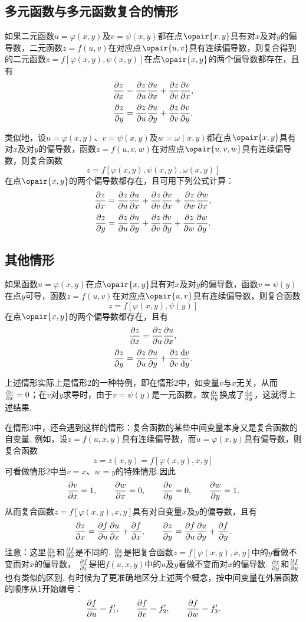 \subsection{多元函数与多元函数复合的情形}
\begin{theorem}
如果二元函数\(u=\varphi(x,y)\)及\(v=\psi(x,y)\)都在点\(\opair{x,y}\)具有对\(x\)及对\(y\)的偏导数，二元函数\(z=f(u,v)\)在对应点\(\opair{u,v}\)具有连续偏导数，则复合得到的二元函数\(z=f[\varphi(x,y),\psi(x,y)]\)在点\(\opair{x,y}\)的两个偏导数都存在，且有\[
\pdv{z}{x} = \pdv{z}{u}\pdv{u}{x} + \pdv{z}{v}\pdv{v}{x},
\]\[
\pdv{z}{y} = \pdv{z}{u}\pdv{u}{y} + \pdv{z}{v}\pdv{v}{y}.
\]
\end{theorem}
类似地，设\(u=\varphi(x,y)\)、\(v=\psi(x,y)\)及\(w=\omega(x,y)\)都在点\(\opair{x,y}\)具有对\(x\)及对\(y\)的偏导数，函数\(z=f(u,v,w)\)在对应点\(\opair{u,v,w}\)具有连续偏导数，则复合函数\[
z = f[\varphi(x,y),\psi(x,y),\omega(x,y)]
\]在点\(\opair{x,y}\)的两个偏导数都存在，且可用下列公式计算：\[
\pdv{z}{x} = \pdv{z}{u}\pdv{u}{x} + \pdv{z}{v}\pdv{v}{x} + \pdv{z}{w}\pdv{w}{x},
\]\[
\pdv{z}{y} = \pdv{z}{u}\pdv{u}{y} + \pdv{z}{v}\pdv{v}{y} + \pdv{z}{w}\pdv{w}{y}.
\]

\subsection{其他情形}
\begin{theorem}
如果函数\(u=\varphi(x,y)\)在点\(\opair{x,y}\)具有对\(x\)及对\(y\)的偏导数，函数\(v=\psi(y)\)在点\(y\)可导，函数\(z=f(u,v)\)在对应点\(\opair{u,v}\)具有连续偏导数，则复合函数\[
z = f[\varphi(x,y),\psi(y)]
\]在点\(\opair{x,y}\)的两个偏导数都存在，且有\[
\pdv{z}{x} = \pdv{z}{u} \pdv{u}{x},
\]\[
\pdv{z}{y} = \pdv{z}{u} \pdv{u}{y} + \pdv{z}{v} \dv{v}{y}.
\]
\end{theorem}
上述情形实际上是情形2的一种特例，即在情形2中，如变量\(v\)与\(x\)无关，从而\(\pdv{v}{x}=0\)；在\(v\)对\(y\)求导时，由于\(v=\psi(y)\)是一元函数，故\(\pdv{v}{y}\)换成了\(\dv{v}{y}\)，这就得上述结果.

在情形3中，还会遇到这样的情形：复合函数的某些中间变量本身又是复合函数的自变量.
例如，设\(z = f(u,x,y)\)具有连续偏导数，而\(u=\varphi(x,y)\)具有偏导数，则复合函数\[
z = z(x,y) = f[\varphi(x,y),x,y]
\]可看做情形2中当\(v=x\)、\(w=y\)的特殊情形.因此\[
\pdv{v}{x} = 1, \qquad \pdv{w}{x} = 0,
\qquad
\pdv{v}{y} = 0, \qquad \pdv{w}{y} = 1.
\]从而复合函数\(z = f[\varphi(x,y),x,y]\)具有对自变量\(x\)及\(y\)的偏导数，且有\[
\pdv{z}{x} = \pdv{f}{u} \pdv{u}{x} + \pdv{f}{x},
\qquad
\pdv{z}{y} = \pdv{f}{u} \pdv{u}{y} + \pdv{f}{y}.
\]
注意：这里\(\pdv{z}{x}\)和\(\pdv{f}{x}\)是不同的.
\(\pdv{z}{x}\)是把复合函数\(z = f[\varphi(x,y),x,y]\)中的\(y\)看做不变而对\(x\)的偏导数，%
\(\pdv{f}{x}\)是把\(f(u,x,y)\)中的\(u\)及\(y\)看做不变而对\(x\)的偏导数.
\(\pdv{z}{y}\)和\(\pdv{f}{y}\)也有类似的区别.
有时候为了更准确地区分上述两个概念，按中间变量在外层函数的顺序从1开始编号：\[
\pdv{f}{u} = f_1', \qquad
\pdv{f}{v} = f_2', \qquad
\pdv{f}{w} = f_3'.
\]

